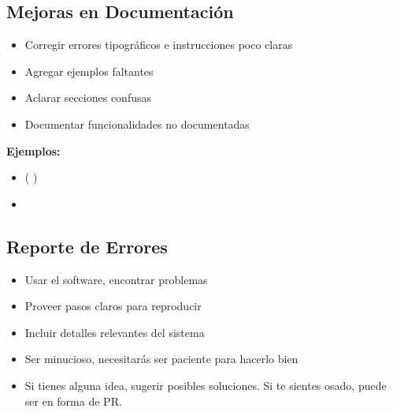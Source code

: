 \documentclass{presentacion}
\begin{document}
\subsection{Mejoras en Documentación}
\begin{frame}
    \begin{itemize}[<+->]
        \item Corregir errores tipográficos e instrucciones poco claras
        \item Agregar ejemplos faltantes
        \item Aclarar secciones confusas
        \item Documentar funcionalidades no documentadas
    \end{itemize}
    
    \vspace{1em}
    {\textbf{Ejemplos:}}
    \begin {itemize}
        \item \small{}
        ( \small{})
        \item \small{}
    \end {itemize}
\end{frame}

\subsection{Reporte de Errores}
\begin{frame}
    \begin{itemize}[<+->]
        \item Usar el software, encontrar problemas
        \item Proveer pasos claros para reproducir
        \item Incluir detalles relevantes del sistema
        \item Ser minucioso, necesitarás ser paciente para hacerlo bien
        \item Si tienes alguna idea, sugerir posibles soluciones. Si te sientes osado, puede ser en forma de PR.
    \end{itemize}  
    
    \vspace{1em}
\end{frame}
\end{document}

